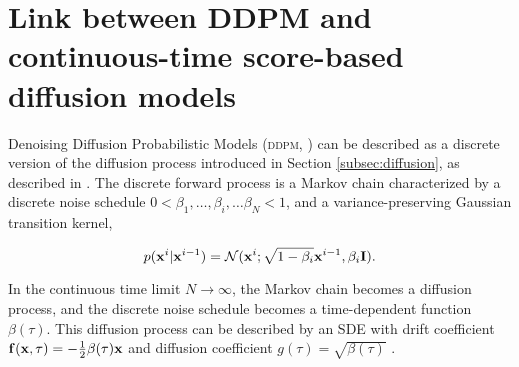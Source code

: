 \section{Link between DDPM and continuous-time score-based diffusion models}
\label{app:ddpm}

Denoising Diffusion Probabilistic Models (\textsc{ddpm}, \citet{ho2020DDPM}) can be described as a discrete version of the diffusion process introduced in Section \ref{subsec:diffusion}, as described in \citet{song_sde}. The discrete forward process is a Markov chain characterized by a discrete noise schedule $0 < \beta_1, \dots, \beta_i, \dots \beta_N < 1$, and a variance-preserving Gaussian transition kernel,

\begin{equation}
    p(\mathbf{x}^i|\mathbf{x}^{i-1}) = \mathcal{N}(\mathbf{x}^i; \sqrt{1-\beta_i} \mathbf{x}^{i-1}, \beta_i \mathbf{I}).
\end{equation}

In the continuous time limit $N \to \infty$, the Markov chain becomes a diffusion process, and the discrete noise schedule becomes a time-dependent function $\beta(\tau)$. This diffusion process can be described by an SDE with drift coefficient $\mathbf{f}(\mathbf{x}, \tau) = -\frac{1}{2}\beta(\tau)\mathbf{x}$ and diffusion coefficient $g(\tau) = \sqrt{\beta(\tau)}$ \citep{song_sde}. 

